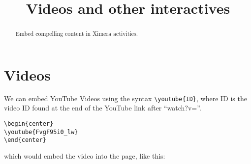\documentclass{ximera}
\title{Videos and other interactives}
\begin{document}
\begin{abstract}
  Embed compelling content in Ximera activities.
\end{abstract}
\maketitle

\section{Videos}

We can embed YouTube Videos using the syntax \verb|\youtube{ID}|, where ID
is the video ID found at the end of the YouTube link after ``watch?v=''.
\begin{verbatim}
\begin{center}
\youtube{FvgF95i0_lw}
\end{center}
\end{verbatim}
which would embed the video into the page, like this:
\begin{center}
\end{center}
\end{document}
